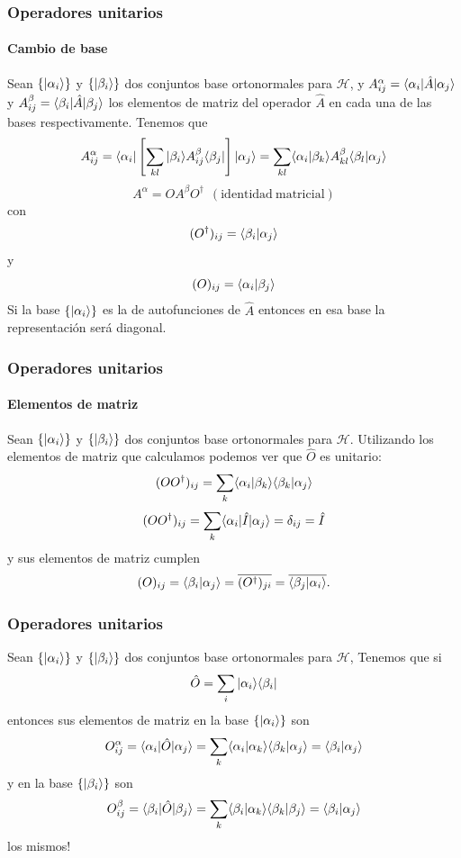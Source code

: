 \documentclass{beamer}
\begin{document}
\begin{frame}
    \frametitle{Operadores unitarios}
    \framesubtitle{Cambio de base}
        Sean $\{| \alpha_i \rangle\}$ y $\{| \beta_i \rangle\}$ dos conjuntos base ortonormales para $\mathcal{H}$, y $A^\alpha_{ij}=\langle \alpha_i |\hat{A}| \alpha_j \rangle$ y $A^\beta_{ij}=\langle \beta_i |\hat{A}| \beta_j \rangle$ los elementos de matriz del operador $\hat{A}$ en cada una de las bases respectivamente. Tenemos que
        \[ A^\alpha_{ij} = \langle \alpha_i | \left[\sum_{kl} | \beta_i \rangle A^\beta_{ij}\langle \beta_j |  \right] | \alpha_j \rangle=\sum_{kl} \langle \alpha_i | \beta_k \rangle A^\beta_{kl} \langle \beta_l | \alpha_j \rangle \]
        \[ A^\alpha = OA^\beta O^\dagger\ \  \mathrm{(identidad\ matricial)} \]
    con
        \[ (O^\dagger)_{ij} = \langle \beta_i | \alpha_j \rangle \]
    y
        \[ (O)_{ij} = \langle \alpha_i | \beta_j \rangle \]
    Si la base $\{| \alpha_i \rangle\}$ es la de autofunciones de $\hat{A}$ entonces en esa base la representación será diagonal.
\end{frame} 

\begin{frame}
    \frametitle{Operadores unitarios}
    \framesubtitle{Elementos de matriz}
        Sean $\{| \alpha_i \rangle\}$ y $\{| \beta_i \rangle\}$ dos conjuntos base ortonormales para $\mathcal{H}$. Utilizando los elementos de matriz que calculamos podemos ver que $\hat{O}$ es unitario:
        \[ (OO^\dagger)_{ij} = \sum_{k} \langle \alpha_i | \beta_k \rangle\langle \beta_k | \alpha_j \rangle \]
        \[ (OO^\dagger)_{ij} = \sum_{k} \langle \alpha_i |\hat{I}| \alpha_j \rangle = \delta_{ij} = \hat{I}\]
        y sus elementos de matriz cumplen
        \[ (O)_{ij} = \langle \beta_i | \alpha_j \rangle = \overline{(O^\dagger)_{ji}} = \overline{\langle \beta_j | \alpha_i \rangle}.\]

\end{frame} 

\begin{frame}
    \frametitle{Operadores unitarios}  
    Sean $\{| \alpha_i \rangle\}$ y $\{| \beta_i \rangle\}$ dos conjuntos base ortonormales para $\mathcal{H}$, Tenemos que si
    \[ \hat{O} = \sum_{i} | \alpha_i \rangle\langle \beta_i |  \]
    entonces sus elementos de matriz en la base $\{| \alpha_i \rangle\}$ son
    \[ O^\alpha_{ij}=\langle \alpha_i |\hat{O}| \alpha_j \rangle=\sum_{k} \langle \alpha_i | \alpha_k \rangle\langle \beta_k | \alpha_j \rangle = \langle \beta_i | \alpha_j \rangle \]
    y en la base $\{| \beta_i \rangle\}$ son
    \[ O^\beta_{ij}=\langle \beta_i |\hat{O}| \beta_j \rangle=\sum_{k} \langle \beta_i | \alpha_k \rangle\langle \beta_k | \beta_j \rangle = \langle \beta_i | \alpha_j \rangle \]
    los mismos!


\end{frame} 
\end{document}
